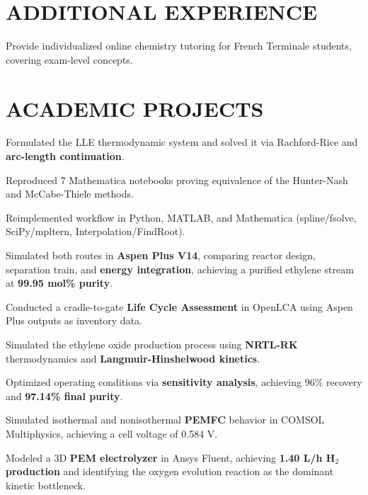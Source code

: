 \documentclass[10pt]{article}
\begin{document}
\section{ADDITIONAL EXPERIENCE}
\begin{bul}
\item Provide individualized online chemistry tutoring for French Terminale students, covering exam-level concepts.
\end{bul}

\section{ACADEMIC PROJECTS}
\begin{bul}
\item Formulated the LLE thermodynamic system and solved it via Rachford-Rice and \textbf{arc-length continuation}.
\item Reproduced 7 Mathematica notebooks proving equivalence of the Hunter-Nash and McCabe-Thiele methods.
\item Reimplemented workflow in Python, MATLAB, and Mathematica (spline/fsolve, SciPy/mpltern, Interpolation/FindRoot).
\end{bul}
\begin{bul}
\item Simulated both routes in \textbf{Aspen Plus V14}, comparing reactor design, separation train, and \textbf{energy integration}, achieving a purified ethylene stream at \textbf{99.95 mol\% purity}.
\item Conducted a cradle-to-gate \textbf{Life Cycle Assessment} in OpenLCA using Aspen Plus outputs as inventory data.
\end{bul}
\begin{bul}
\item Simulated the ethylene oxide production process using \textbf{NRTL-RK} thermodynamics and \textbf{Langmuir-Hinshelwood kinetics}.
\item Optimized operating conditions via \textbf{sensitivity analysis}, achieving 96\% recovery and \textbf{97.14\% final purity}.
\end{bul}
\begin{bul}
\item Simulated isothermal and nonisothermal \textbf{PEMFC} behavior in COMSOL Multiphysics, achieving a cell voltage of 0.584 V.
\item Modeled a 3D \textbf{PEM electrolyzer} in Ansys Fluent, achieving \textbf{1.40 L/h H$_2$ production} and identifying the oxygen evolution reaction as the dominant kinetic bottleneck.
\end{bul}
\end{document}
